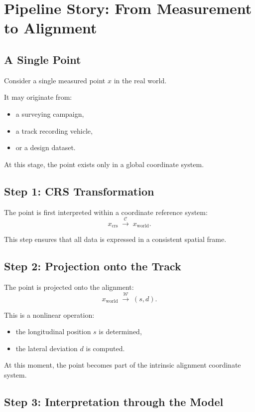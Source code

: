 
\section{Pipeline Story: From Measurement to Alignment}

\subsection{A Single Point}

Consider a single measured point \(x\) in the real world.

It may originate from:
\begin{itemize}
\item a surveying campaign,
\item a track recording vehicle,
\item or a design dataset.
\end{itemize}

At this stage, the point exists only in a global coordinate system.

\subsection{Step 1: CRS Transformation}

The point is first interpreted within a coordinate reference system:
\[
x_{\mathrm{crs}}
\;\xrightarrow{\mathcal{C}}\;
x_{\mathrm{world}}.
\]

This step ensures that all data is expressed in a consistent spatial
frame.

\subsection{Step 2: Projection onto the Track}

The point is projected onto the alignment:
\[
x_{\mathrm{world}}
\;\xrightarrow{\mathcal{W}}\;
(s,d).
\]

This is a nonlinear operation:
\begin{itemize}
\item the longitudinal position \(s\) is determined,
\item the lateral deviation \(d\) is computed.
\end{itemize}

At this moment, the point becomes part of the intrinsic alignment
coordinate system.

\subsection{Step 3: Interpretation through the Model}

